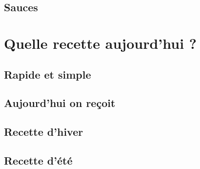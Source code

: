 \documentclass[A4paper,twoside, 12pt]{book}
\begin{document}
	\chapter{Sauces}


\part{Quelle recette aujourd'hui ?}
	\chapter{Rapide et simple}
	\chapter{Aujourd'hui on reçoit}
	\chapter{Recette d'hiver}
	\chapter{Recette d'\'et\'e}

\backmatter
\end{document}
